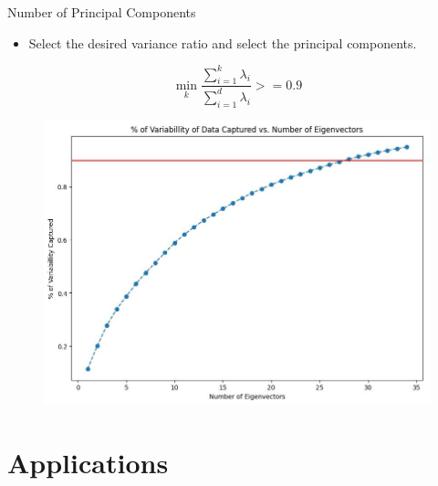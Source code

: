 \documentclass[serif, aspectratio=169]{beamer}
\begin{document}
\begin{frame}{Number of Principal Components}
    \begin{minipage}{0.4\textwidth}
         \begin{itemize}
            \item Select the desired variance ratio and select the principal components.
        \end{itemize}
         $$\min_k \frac{\sum_{i=1}^{k} \lambda_i}{\sum_{i=1}^{d} \lambda_i} >= 0.9$$
    \end{minipage}
    \begin{minipage}{0.55\textwidth}
        \begin{figure}[htpb]
            \begin{center}
                \includegraphics[keepaspectratio, scale=0.4]{pic/PCA_var.JPG}
            \end{center}
        \end{figure}
    \end{minipage}
\end{frame}

\section{Applications}
\end{document}
